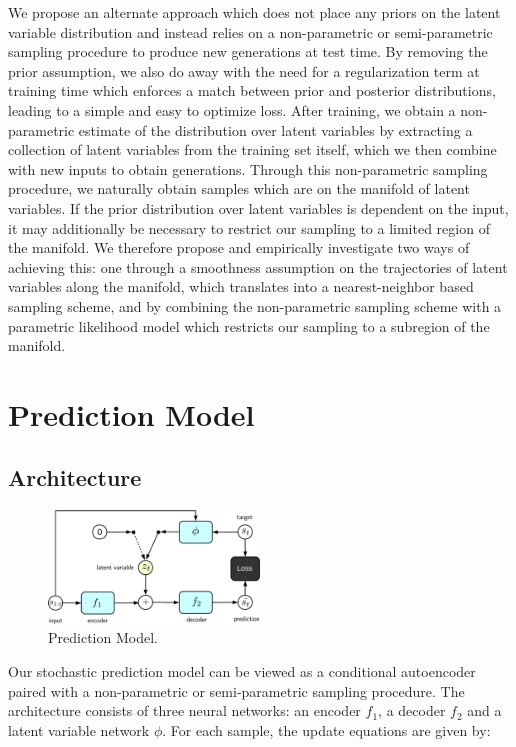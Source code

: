 \documentclass{article}
\begin{document}
We propose an alternate approach which does not place any priors on the latent variable distribution and instead relies on a non-parametric or semi-parametric sampling procedure to produce new generations at test time.
By removing the prior assumption, we also do away with the need for a regularization term at training time which enforces a match between prior and posterior distributions, leading to a simple and easy to optimize loss. After training, we obtain a non-parametric estimate of the distribution over latent variables by extracting a collection of latent variables from the training set itself, which we then combine with new inputs to obtain generations.
Through this non-parametric sampling procedure, we naturally obtain samples which are on the manifold of latent variables.
If the prior distribution over latent variables is dependent on the input, it may additionally be necessary to restrict our sampling to a limited region of the manifold.
We therefore propose and empirically investigate two ways of achieving this: one through a smoothness assumption on the trajectories of latent variables along the manifold, which translates into a nearest-neighbor based sampling scheme, and by combining the non-parametric sampling scheme with a parametric likelihood model which restricts our sampling to a subregion of the manifold.


\section{Prediction Model}

\subsection{Architecture}


\begin{figure}
  \centering
  \includegraphics[width=0.5\textwidth]{images/ae_train-crop.pdf}
  \caption{Prediction Model. }
\end{figure}


Our stochastic prediction model can be viewed as a conditional autoencoder paired with a non-parametric  or semi-parametric sampling procedure.
The architecture consists of three neural networks: an encoder $f_1$, a decoder $f_2$ and a latent variable network $\phi$.
For each sample, the update equations are given by:
\end{document}

